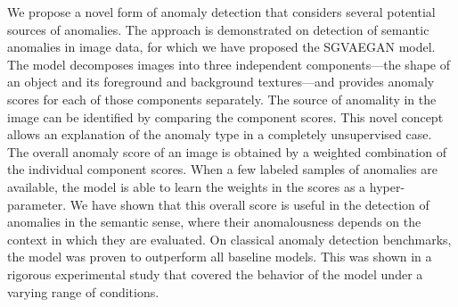 We propose a novel form of anomaly detection that considers several potential sources of anomalies. The approach is demonstrated on detection of semantic anomalies in image data, for which we have proposed the SGVAEGAN model. The model decomposes images into three independent components---the shape of an object and its foreground and background textures---and provides anomaly scores for each of those components separately. The source of anomality in the image can be identified by comparing the component scores. This novel concept  allows an explanation of the anomaly type in a completely unsupervised case. 
The overall anomaly score of an image is obtained by a weighted combination of the individual component scores. When a few labeled samples of anomalies are available, the model is able to learn the weights in the scores as a hyper-parameter. We have shown that this overall score is useful in the detection of anomalies in the semantic sense, where their anomalousness depends on the context in which they are evaluated. On classical anomaly detection benchmarks, the model was proven to outperform all baseline models. This was shown in a rigorous experimental study that covered the behavior of the model under a varying range of conditions.

